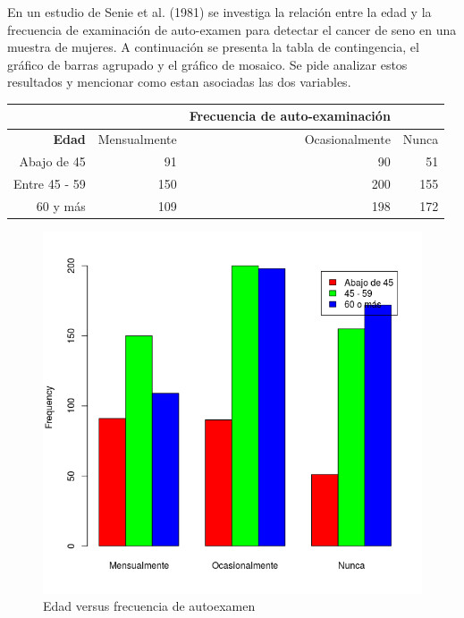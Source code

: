 \documentclass[11pt,evaluacion]{uescimat}
\begin{document}
\begin{problema}
En un estudio de Senie et al. (1981) se investiga la relación entre la edad y la frecuencia de examinación de auto-examen para detectar el cancer de seno en una muestra de mujeres. A continuación se presenta la tabla de contingencia, el gráfico de barras agrupado y el gráfico de mosaico. Se pide analizar estos resultados y mencionar como estan asociadas las dos variables. 

\begin{table}[H]
\centering
\begin{tabular}{rrrr}
\hline 
 & & \textbf{Frecuencia de auto-examinación} & \\
  \hline
\textbf{Edad} & Mensualmente & Ocasionalmente & Nunca \\ 
  \hline
Abajo de 45 &   91 &   90 &   51 \\ 
Entre 45 - 59 &  150 &  200 &  155 \\ 
60 y más  &   109 &  198 &   172 \\ 
   \hline
\end{tabular}
\end{table}


\begin{figure}[H]
\begin{centering}
\includegraphics[scale=0.30]{imagen3.png}
\par\end{centering}
\caption{Edad versus frecuencia de autoexamen}
\end{figure}


\end{problema}
\end{document}
